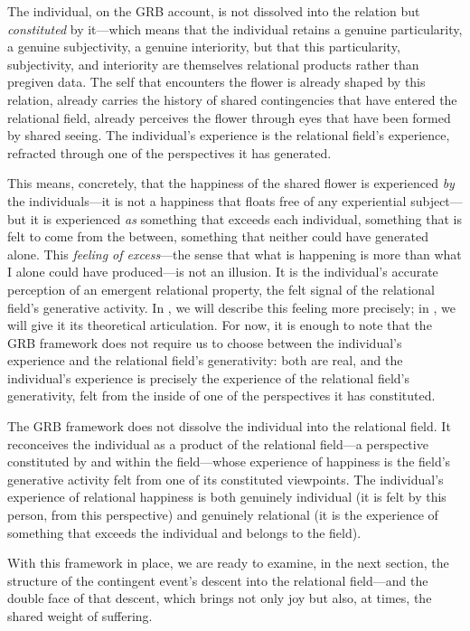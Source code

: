 The individual, on the GRB account, is not dissolved into the relation but \emph{constituted} by it---which means that the individual retains a genuine particularity, a genuine subjectivity, a genuine interiority, but that this particularity, subjectivity, and interiority are themselves relational products rather than pregiven data. The self that encounters the flower is already shaped by this relation, already carries the history of shared contingencies that have entered the relational field, already perceives the flower through eyes that have been formed by shared seeing. The individual's experience is the relational field's experience, refracted through one of the perspectives it has generated.

This means, concretely, that the happiness of the shared flower is experienced \emph{by} the individuals---it is not a happiness that floats free of any experiential subject---but it is experienced \emph{as} something that exceeds each individual, something that is felt to come from the between, something that neither could have generated alone. This \emph{feeling of excess}---the sense that what is happening is more than what I alone could have produced---is not an illusion. It is the individual's accurate perception of an emergent relational property, the felt signal of the relational field's generative activity. In , we will describe this feeling more precisely; in , we will give it its theoretical articulation. For now, it is enough to note that the GRB framework does not require us to choose between the individual's experience and the relational field's generativity: both are real, and the individual's experience is precisely the experience of the relational field's generativity, felt from the inside of one of the perspectives it has constituted.

\begin{claim}
The GRB framework does not dissolve the individual into the relational field. It reconceives the individual as a product of the relational field---a perspective constituted by and within the field---whose experience of happiness is the field's generative activity felt from one of its constituted viewpoints. The individual's experience of relational happiness is both genuinely individual (it is felt by this person, from this perspective) and genuinely relational (it is the experience of something that exceeds the individual and belongs to the field).
\end{claim}

With this framework in place, we are ready to examine, in the next section, the structure of the contingent event's descent into the relational field---and the double face of that descent, which brings not only joy but also, at times, the shared weight of suffering.
